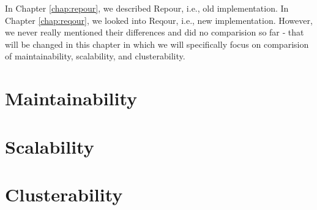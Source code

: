 \documentclass[../main.tex]{subfiles}
\begin{document}
In Chapter \ref{chap:repour}, we described Repour, i.e., old implementation. In Chapter \ref{chap:reqour}, we looked into Reqour, i.e., new implementation. However, we never really mentioned their differences and did no comparision so far ‐ that will be changed in this chapter in which we will specifically focus on comparision of maintainability, scalability, and clusterability.

\section{Maintainability}


\section{Scalability}


\section{Clusterability}

\end{document}

